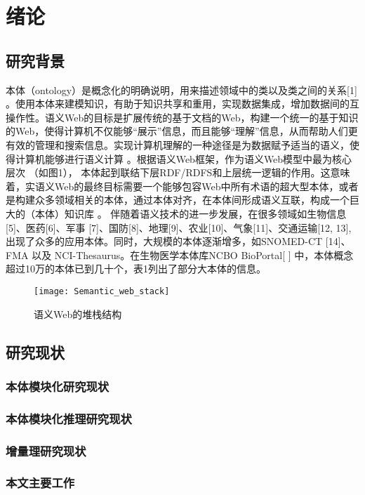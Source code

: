 
\chapter{绪论}
\section{研究背景}
本体（ontology）是概念化的明确说明，用来描述领域中的类以及类之间的关系[1] 。使用本体来建模知识，有助于知识共享和重用，实现数据集成，增加数据间的互操作性。语义Web的目标是扩展传统的基于文档的Web，构建一个统一的基于知识的Web，使得计算机不仅能够“展示”信息，而且能够“理解”信息，从而帮助人们更有效的管理和搜索信息。实现计算机理解的一种途径是为数据赋予适当的语义，使得计算机能够进行语义计算 。根据语义Web框架，作为语义Web模型中最为核心层次 （如图1）， 本体起到联结下层RDF/RDFS和上层统一逻辑\cite{}的作用。这意味着，实语义Web的最终目标需要一个能够包容Web中所有术语的超大型本体，或者是构建众多领域相关的本体，通过本体对齐，在本体间形成语义互联，构成一个巨大的（本体）知识库 。
伴随着语义技术的进一步发展，在很多领域如生物信息[5]、医药[6]、军事 [7]、国防[8]、地理[9]、农业[10]、气象[11]、交通运输[12, 13], 出现了众多的应用本体。同时，大规模的本体逐渐增多，如SNOMED-CT [14]、FMA 以及 NCI-Thesaurus。在生物医学本体库NCBO BioPortal[  ] 中，本体概念超过10万的本体已到几十个，表1列出了部分大本体的信息。
\begin{figure} [b] %
  \centering
  \texttt{[image: Semantic\_web\_stack]}
  \caption{语义Web的堆栈结构}\label{fig:1}
\end{figure}
\section{研究现状}

\subsection{本体模块化研究现状}
\subsection{本体模块化推理研究现状}
\subsection{增量理研究现状}
\subsection{本文主要工作}
